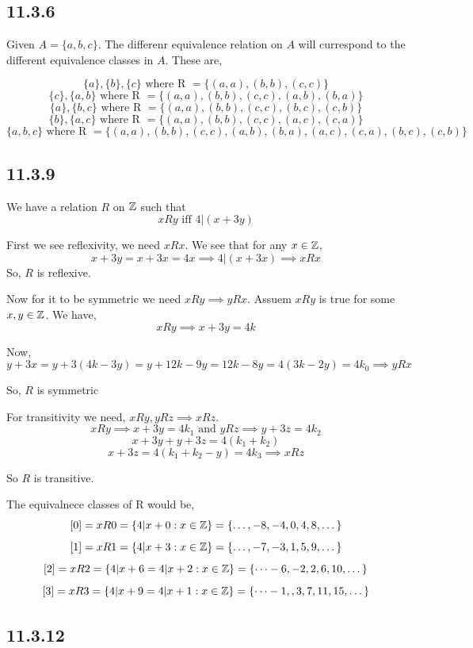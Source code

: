 \documentclass[a4paper]{report}
\begin{document}
\subsection*{11.3.6}
Given $A = \{a,b,c\}$. The differenr equivalence relation on $A$ will currespond to the different equivalence classes in $A$. These are, 

$$ \{a\}, \{b\}, \{c\} \text{ where R } = \{(a,a),(b,b),(c,c)\}$$ 
$$ \{c\}, \{a,b\}\text{ where R } = \{(a,a),(b,b),(c,c),(a,b),(b,a)\}$$ 
$$ \{a\},\{b,c\}\text{ where R } = \{(a,a),(b,b),(c,c), (b,c),(c,b)\}$$ 
$$  \{b\},\{a,c\}\text{ where R } = \{(a,a),(b,b),(c,c),(a,c),(c,a)\}$$ 
$$ \{a,b,c\}\text{ where R } = \{(a,a),(b,b),(c,c),(a,b),(b,a),(a,c),(c,a),(b,c),(c,b)\}$$ 


\subsection*{11.3.9}
We have a relation $R$ on $\mathbb{Z}$ such that 
$$ xRy \text{ iff } 4 | (x + 3y)$$ 

First we see reflexivity, we need $xRx$. We see that for any $x \in \mathbb{Z}$, 
$$ x + 3y = x + 3x = 4x \implies 4 | (x + 3x) \implies xRx $$ 
So, $R$ is reflexive.

Now for it to be symmetric we need $xRy \implies yRx$. Assuem $xRy$ is true for some $x,y \in \mathbb{Z}$. We have, 
$$ xRy \implies  x + 3y = 4k $$ 

Now, $$y + 3x = y + 3(4k - 3y) = y + 12k - 9y = 12k - 8y = 4(3k - 2y) = 4k_0 \implies yRx$$

So, $R$ is symmetric

For transitivity we need, $xRy, yRz \implies xRz$. 
$$ xRy  \implies x + 3y = 4k_1 \text{ and } yRz \implies y + 3z = 4k_2$$ 
$$  x + 3y + y + 3z = 4(k_1 + k_2)$$ 
$$ x + 3z  = 4(k_1 +k_2 - y) = 4k_3 \implies xRz $$ 

So $R$ is transitive.


The equivalnece classes of R would be, 
$$ [0] =  xR0 = \{4 | x + 0:x \in \mathbb{Z}\} = \{\dots, -8,-4,0,4,8,\dots\} $$ 
$$ [1] =  xR1 = \{4 | x + 3:x \in \mathbb{Z}\} = \{\dots,-7, -3, 1, 5, 9,\dots\} $$ 
$$ [2] =  xR2 = \{4 | x + 6 = 4 | x + 2:x \in \mathbb{Z}\} = \{\dots-6,-2,2,6,10,\dots\} $$ 
$$ [3] =  xR3 = \{4 | x + 9 = 4 | x + 1:x \in \mathbb{Z}\} = \{\dots-1,,3,7,11,15,\dots\} $$ 


\subsection*{11.3.12}
\end{document}
